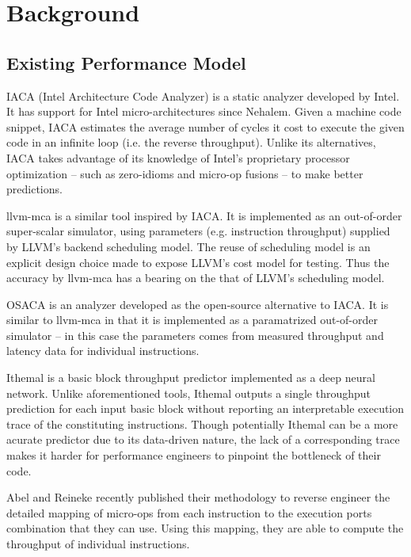 \section{Background}

\subsection{Existing Performance Model}
IACA (Intel Architecture Code Analyzer) is a static analyzer
developed by Intel. It has support for Intel micro-architectures
since Nehalem.
Given a machine code snippet, IACA estimates the average number
of cycles it cost to execute the given code in an infinite 
loop (i.e. the reverse throughput).
Unlike its alternatives, IACA takes advantage of its knowledge
of Intel's proprietary processor optimization
-- such as zero-idioms and micro-op fusions -- to make better 
predictions.

llvm-mca is a similar tool inspired by IACA. 
It is implemented as an out-of-order super-scalar simulator,
using parameters (e.g. instruction throughput)
supplied by LLVM\cite{llvm}'s backend scheduling model.
The reuse of scheduling model is an explicit design choice
made to expose LLVM's cost model for testing.
Thus the accuracy by llvm-mca has a bearing on the 
that of LLVM's scheduling model.

OSACA\cite{osaca} is an analyzer developed as the open-source
alternative to IACA. It is similar to llvm-mca in that
it is implemented as a paramatrized out-of-order simulator
-- in this case the parameters comes from measured throughput
and latency data for individual instructions.

Ithemal\cite{ithemal} is a basic block throughput predictor
implemented as a deep neural network. Unlike aforementioned 
tools, Ithemal outputs a single throughput prediction for each
input basic block without reporting an interpretable execution
trace of the constituting instructions.
Though potentially Ithemal can be a more acurate predictor
due to its data-driven nature, the lack of a corresponding 
trace makes it harder for performance engineers to pinpoint
the bottleneck of their code.

Abel and Reineke\cite{uops} recently published their methodology
to reverse engineer the detailed mapping of micro-ops
from each instruction to the execution ports combination
that they can use. Using this mapping, they are able to compute the 
throughput of individual instructions.

